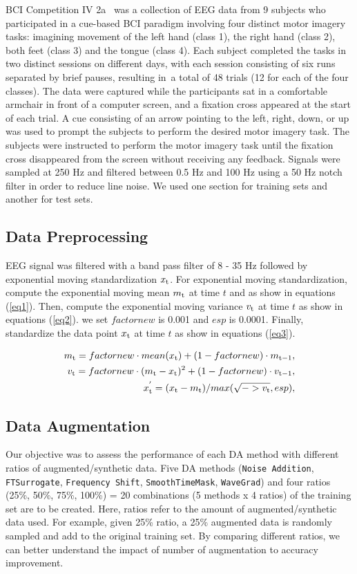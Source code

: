 \documentclass[runningheads]{llncs}
\begin{document}
BCI Competition IV 2a \cite{brunner2008bci} was a collection of EEG data from 9 subjects who participated in a cue-based BCI paradigm involving four distinct motor imagery tasks: imagining movement of the left hand (class 1), the right hand (class 2), both feet (class 3) and the tongue (class 4). Each subject completed the tasks in two distinct sessions on different days, with each session consisting of six runs separated by brief pauses, resulting in a total of 48 trials (12 for each of the four classes). The data were captured while the participants sat in a comfortable armchair in front of a computer screen, and a fixation cross appeared at the start of each trial. A cue consisting of an arrow pointing to the left, right, down, or up was used to prompt the subjects to perform the desired motor imagery task. The subjects were instructed to perform the motor imagery task until the fixation cross disappeared from the screen without receiving any feedback. Signals were sampled at 250 Hz and filtered between 0.5 Hz and 100 Hz using a 50 Hz notch filter in order to reduce line noise. We used one section for training sets and another for test sets.

\subsection{Data Preprocessing}
EEG signal was filtered with a band pass filter of 8 - 35 Hz followed by exponential moving standardization $x_{\rm t}$. For exponential moving standardization, compute the exponential moving mean $m_{\rm t}$ at time $t$ and as show in equations (\ref{eq1}).
Then, compute the exponential moving variance $v_{\rm t}$ at time $t$ as show in equations (\ref{eq2}).
we set $factornew$ is 0.001 and $esp$ is 0.0001. Finally, standardize the data point $x_{\rm t}$ at time $t$ as show in equations (\ref{eq3}).

\begin{eqnarray} 
m_{\rm t} = factornew \cdot mean(x_{\rm t}) + (1 - factornew) \cdot m_{\rm t-1}, \label{eq1}\\
v_{\rm t} = factornew\cdot (m_{\rm t} - x_{\rm t})^{2} + (1 - factornew) \cdot v_{\rm t-1} , \label{eq2} \\ 
x_{\rm t}^{'}  = (x_{\rm t}-m_{\rm t})/max(\sqrt{->v_{\rm t}},esp), \label{eq3} 
\end{eqnarray}


\subsection{Data Augmentation}
Our objective was to assess the performance of each DA method with different ratios of augmented/synthetic data. Five DA methods (\texttt{Noise Addition}, \texttt{FTSurrogate}, \texttt{Frequency Shift}, \texttt{SmoothTimeMask}, \texttt{WaveGrad}) and four ratios (25\%, 50\%, 75\%, 100\%) = 20 combinations (5 methods x 4 ratios) of the training set are to be created.  Here, ratios refer to the amount of augmented/synthetic data used.  For example, given 25\% ratio, a 25\% augmented data is randomly sampled and add to the original training set.  By comparing different ratios, we can better understand the impact of number of augmentation to accuracy improvement.
\end{document}
